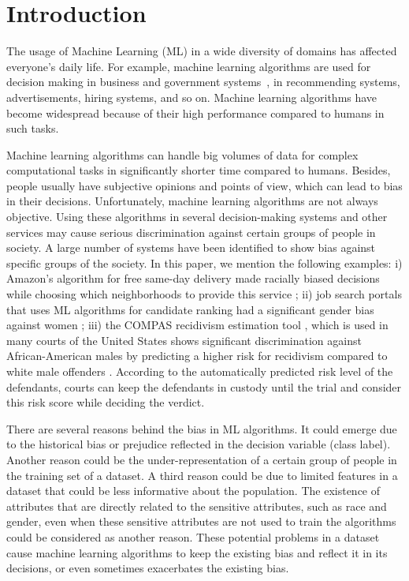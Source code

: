 \section{Introduction}

The usage of Machine Learning (ML) in a wide diversity of domains has affected everyone's daily life. For example, machine learning algorithms are used for decision making in business and government systems~\cite{rudin2019stop}, in recommending systems, advertisements, hiring systems, and so on. Machine learning algorithms have become widespread because of their high performance compared to humans in such tasks. 

Machine learning algorithms can handle big volumes of data for complex computational tasks in significantly shorter time compared to humans. Besides, people usually have subjective opinions and points of view, which can lead to bias in their decisions. 
Unfortunately, machine learning algorithms are not always objective. Using these algorithms in several decision-making systems and other services may cause serious discrimination against certain groups of people in society. A large number of systems have been identified to show bias against specific groups of the society. In this paper, we mention the following examples:  i) Amazon's algorithm for free same-day delivery made racially biased decisions while choosing which neighborhoods to provide this service \cite{soper_2016,letzter_2016}; ii) job search portals that uses ML algorithms for candidate ranking had a significant gender bias against women \cite{lahoti2019ifair}; iii) the COMPAS recidivism estimation tool \cite{compas}, which is used in many courts of the United States shows significant discrimination against African-American males by predicting a higher risk for recidivism compared to white male offenders \cite{propublica}. According to the automatically predicted risk level of the defendants, courts can keep the defendants in custody until the trial and consider this risk score while deciding the verdict. 







There are several reasons behind the bias in ML algorithms. It could emerge due to the historical bias or prejudice reflected in the decision variable (class label). Another reason could be the under-representation of a certain group of people in the training set of a dataset. A third reason could be due to limited features in a dataset that could be less informative about the population. The existence of attributes that are directly related to the sensitive attributes, such as race and gender, even when these sensitive attributes are not used to train the algorithms could be considered as another reason. These potential problems in a dataset cause machine learning algorithms to keep the existing bias and reflect it in its decisions, or even sometimes exacerbates the existing bias.


